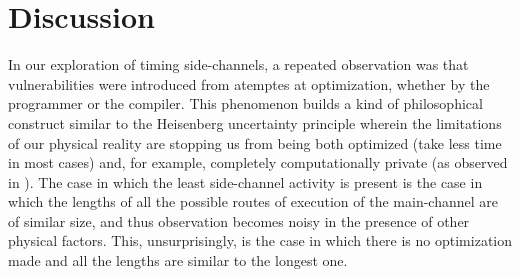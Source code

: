 \section{Discussion}

In our exploration of timing side-channels, a repeated observation was that vulnerabilities were introduced from atemptes at optimization, whether by the programmer or the compiler. 
This phenomenon builds a kind of philosophical construct similar to the Heisenberg
uncertainty principle wherein the limitations of our physical reality are stopping
us from being both optimized (take less time in most cases) and, for example, 
completely computationally private (as observed in \cite{archlab-timing-14}). The
case in which the least side-channel activity is present is the case in which the 
lengths of all the possible routes of execution of the main-channel are of similar
size, and thus observation becomes noisy in the presence of other physical factors.
This, unsurprisingly, is the case in which there is no optimization made and all the
lengths are similar to the longest one.



